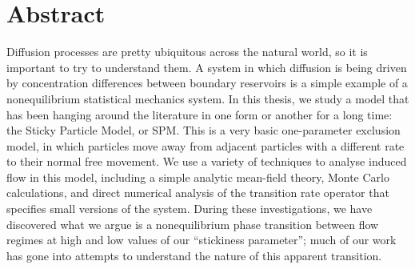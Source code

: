 \chapter{Abstract}

Diffusion processes are pretty ubiquitous across the natural world, so it is important to try to understand them. A system in which diffusion is being driven by concentration differences between boundary reservoirs is a simple example of a nonequilibrium statistical mechanics system. In this thesis, we study a model that has been hanging around the literature in one form or another for a long time: the Sticky Particle Model, or SPM. This is a very basic one-parameter exclusion model, in which particles move away from adjacent particles with a different rate to their normal free movement. We use a variety of techniques to analyse induced flow in this model, including a simple analytic mean-field theory, Monte Carlo calculations, and direct numerical analysis of the transition rate operator 
that specifies small versions of the system. During these investigations, we have discovered what we argue is a nonequilibrium phase transition between flow regimes at high and low values of our “stickiness parameter”; much of our work has gone into attempts to understand the nature of this apparent transition.
